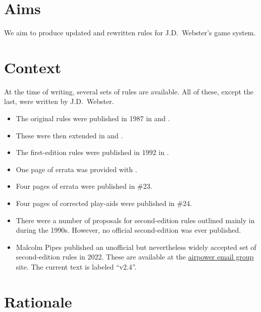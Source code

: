 \documentclass{report}
\begin{document}

\section{Aims}

We aim to produce updated and rewritten rules for J.D.\ Webster's {\AirPow} game system.

\section{Context}

At the time of writing, several sets of rules are available. All of these, except the last, were written by J.D.\ Webster.

\begin{itemize}
    \item The original rules were published in 1987 in {\AirSup} and {\AirStr}.
    \item These were then extended in {\DF} and {\EOTG}.
    \item The first-edition {\AirPow} rules were published in 1992 in {\TSOH}.
    \item One page of errata was provided with {\TSOH}.
    \item Four pages of errata were published in {\APJ} \#23.
    \item Four pages of corrected play-aids were published in {\APJ} \#24.
    \item There were a number of proposals for second-edition {\AirPow} rules outlined mainly in {\APJ} during the 1990s. However, no official second-edition was ever published.
    \item Malcolm Pipes published an unofficial but nevertheless widely accepted set of second-edition {\AirPow} rules in 2022. These are available at the \href{https://airpower.groups.io/g/main}{airpower email group} site. The current text is labeled “v2.4”.
\end{itemize}

\section{Rationale}
\end{document}

